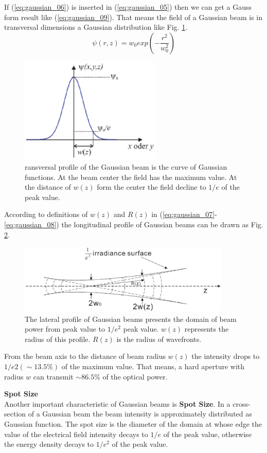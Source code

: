 If (\ref{eq:gaussian_06}) is inserted in (\ref{eq:gaussian_05}) then we can get a Gauss form result like (\ref{eq:gaussian_09}). That means the field of a Gaussian beam is in transversal dimensions a Gaussian distribution like Fig. \ref{fig:gaussian_verteilung}.
\begin{equation}
\psi(r,z)=w_{0}exp\left(-\frac{r^2}{w^2_{0}}\right)
\label{eq:gaussian_09}
\end{equation}
\begin{figure}[!ht]
\centering
\includegraphics[width=0.6\textwidth]{bilder/gussian_verteilung}
\caption{ransversal profile of the Gaussian beam is the curve of Gaussian functions. At the beam center the field has the maximum value. At the distance of $w(z)$ form the center the field decline to $1/e$ of the peak value.}
\label{fig:gaussian_verteilung}
\end{figure}

According to definitions of $w(z)$ and $R(z)$ in (\ref{eq:gaussian_07}-\ref{eq:gaussian_08}) the longitudinal profile of Gaussian beams can be drawn as Fig. \ref{fig:gussian_profile}.
\begin{figure}[!ht]
\centering
\includegraphics[width=0.9\textwidth]{bilder/gussian_profile}
\caption{The lateral profile of Gaussian beams presents the domain of beam power from peak value to $1/e^2$ peak value. $w(z)$ represents the radius of this profile. $R(z)$ is the radius of wavefronts.}
\label{fig:gussian_profile}
\end{figure}
From the beam axis to the distance of beam radius $w(z)$ the intensity drops to $1/e2 (\sim13.5\%)$ of the maximum value. That means, a hard aperture with radius $w$ can transmit $\sim86.5\%$ of the optical power.

\textbf{Spot Size}\\
Another important characteristic of Gaussian beams is \textbf{Spot Size}. In a cross-section of a Gaussian beam the beam intensity is approximately distributed as Gaussian function. The spot size is the diameter of the domain at whose edge the value of the electrical field intensity decays to $1/e$ of the peak value, otherwise the energy density decays to $1/e^2$ of the peak value.
